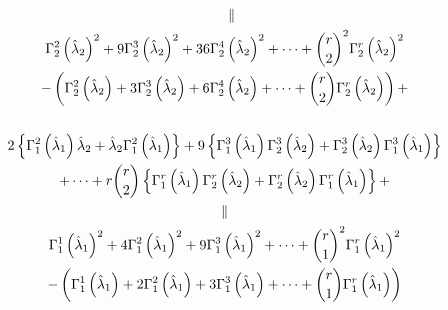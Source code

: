 \documentclass[12pt]{article}
\begin{document}
\begin{gather*}
\quad \parallel \\
\Gamma _{2}^{2}\left( \hat{\lambda}_{2}\right) ^{2}+9\Gamma _{2}^{3}\left( 
\hat{\lambda}_{2}\right) ^{2}+36\Gamma _{2}^{4}\left( \hat{\lambda}%
_{2}\right) ^{2}+\cdots +\binom{r}{2}^{2}\Gamma _{2}^{r}\left( \hat{\lambda}%
_{2}\right) ^{2} \\
-\left( \Gamma _{2}^{2}\left( \hat{\lambda}_{2}\right) +3\Gamma
_{2}^{3}\left( \hat{\lambda}_{2}\right) +6\Gamma _{2}^{4}\left( \hat{\lambda}%
_{2}\right) +\cdots +\binom{r}{2}\Gamma _{2}^{r}\left( \hat{\lambda}%
_{2}\right) \right) + \\
\\
2\left\{ \Gamma _{1}^{2}\left( \hat{\lambda}_{1}\right) \hat{\lambda}_{2}+%
\hat{\lambda}_{2}\Gamma _{1}^{2}\left( \hat{\lambda}_{1}\right) \right\}
+9\left\{ \Gamma _{1}^{3}\left( \hat{\lambda}_{1}\right) \Gamma
_{2}^{3}\left( \hat{\lambda}_{2}\right) +\Gamma _{2}^{3}\left( \hat{\lambda}%
_{2}\right) \Gamma _{1}^{3}\left( \hat{\lambda}_{1}\right) \right\} \\
+\cdots +r\binom{r}{2}\left\{ \Gamma _{1}^{r}\left( \hat{\lambda}_{1}\right)
\Gamma _{2}^{r}\left( \hat{\lambda}_{2}\right) +\Gamma _{2}^{r}\left( \hat{%
\lambda}_{2}\right) \Gamma _{1}^{r}\left( \hat{\lambda}_{1}\right) \right\} +
\\
\parallel \\
\Gamma _{1}^{1}\left( \hat{\lambda}_{1}\right) ^{2}+4\Gamma _{1}^{2}\left( 
\hat{\lambda}_{1}\right) ^{2}+9\Gamma _{1}^{3}\left( \hat{\lambda}%
_{1}\right) ^{2}+\cdots +\binom{r}{1}^{2}\Gamma _{1}^{r}\left( \hat{\lambda}%
_{1}\right) ^{2} \\
-\left( \Gamma _{1}^{1}\left( \hat{\lambda}_{1}\right) +2\Gamma
_{1}^{2}\left( \hat{\lambda}_{1}\right) +3\Gamma _{1}^{3}\left( \hat{\lambda}%
_{1}\right) +\cdots +\binom{r}{1}\Gamma _{1}^{r}\left( \hat{\lambda}%
_{1}\right) \right)
\end{gather*}%
\end{document}
